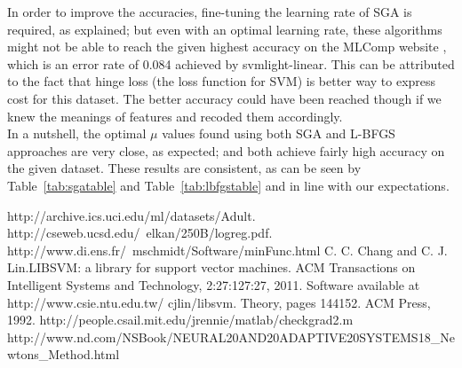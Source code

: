 \documentclass[a4paper]{article}
\begin{document}
In order to improve the accuracies, fine-tuning the learning rate of SGA is required, as explained; but even with an optimal learning rate, these algorithms might not be able to reach the given highest accuracy on the MLComp website \cite{Label1}, which is an error rate of 0.084 achieved by svmlight-linear. This can be attributed to the fact that hinge loss (the loss function for SVM) is better way to express cost for this dataset. The better accuracy could have been reached though if we knew the meanings of features and recoded them accordingly.\\

In a nutshell, the optimal $\mu$ values found using both SGA and L-BFGS approaches are very close, as expected; and both achieve fairly high accuracy on the given dataset. These results are consistent, as can be seen by Table~\ref{tab:sgatable} and Table~\ref{tab:lbfgstable} and in line with our expectations.

\begin{thebibliography}{99}
 http://archive.ics.uci.edu/ml/datasets/Adult.
 http://cseweb.ucsd.edu/~elkan/250B/logreg.pdf.
 http://www.di.ens.fr/~mschmidt/Software/minFunc.html
 C. C. Chang and C. J. Lin.LIBSVM: a library for support vector machines. ACM Transactions on Intelligent Systems and Technology, 2:27:127:27, 2011. Software available at http://www.csie.ntu.edu.tw/ cjlin/libsvm. Theory, pages 144152. ACM Press, 1992.
 http://people.csail.mit.edu/jrennie/matlab/checkgrad2.m
 http://www.nd.com/NSBook/NEURAL20AND20ADAPTIVE20SYSTEMS18\_Newtons\_Method.html
\end{thebibliography}
\end{document}
